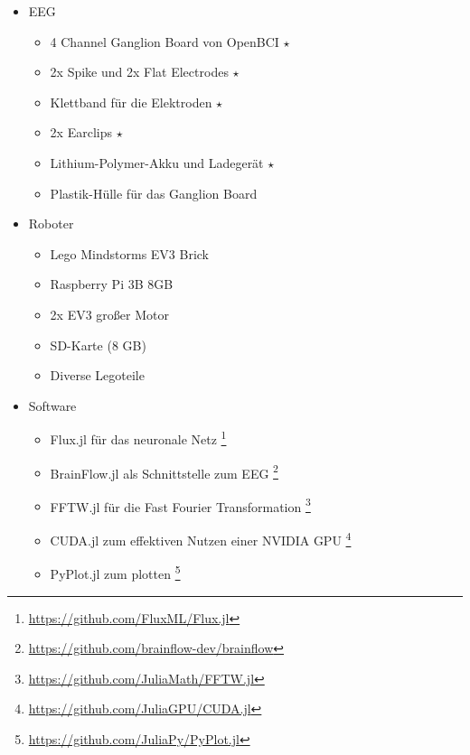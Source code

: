 \documentclass{scrartcl}
\begin{document}
	\begin{itemize}
		\item EEG
		\begin{itemize}
			\item 4 Channel Ganglion Board von OpenBCI $\star$
			\item 2x Spike und 2x Flat Electrodes  $\star$
			\item Klettband für die Elektroden $\star$
			\item 2x Earclips $\star$
			\item Lithium-Polymer-Akku und Ladegerät $\star$
			\item Plastik-Hülle für das Ganglion Board
		\end{itemize}

		\item Roboter
		\begin{itemize}
			\item Lego Mindstorms EV3 Brick
			\item Raspberry Pi 3B 8GB
			\item 2x EV3 großer Motor
			\item SD-Karte (8 GB)
			\item Diverse Legoteile
		\end{itemize}

		\item Software
		\begin{itemize}
			\item Flux.jl für das neuronale Netz
				\footnote{\href{https://github.com/FluxML/Flux.jl}{https://github.com/FluxML/Flux.jl}}
				\cite{Flux.jl-2018}
				\cite{innes:2018}
			
			\item BrainFlow.jl als Schnittstelle zum EEG
				\footnote{\href{https://github.com/brainflow-dev/brainflow}{https://github.com/brainflow-dev/brainflow}}
				\cite{brainflow}
			
			\item FFTW.jl für die Fast Fourier Transformation
				\footnote{\href{https://github.com/JuliaMath/FFTW.jl}{https://github.com/JuliaMath/FFTW.jl}}
				\cite{FFTW.jl-2005}
			
			\item CUDA.jl zum effektiven Nutzen einer NVIDIA GPU
				\footnote{\href{https://github.com/JuliaGPU/CUDA.jl}{https://github.com/JuliaGPU/CUDA.jl}}
				\cite{CUDA}
			
			\item PyPlot.jl zum plotten
				\footnote{\href{https://github.com/JuliaPy/PyPlot.jl}{https://github.com/JuliaPy/PyPlot.jl}}
				\cite{pyplot}
			

\end{itemize}
\end{itemize}
\end{document}
